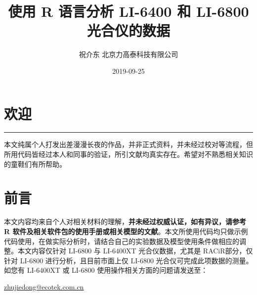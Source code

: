 \documentclass[
]{krantz}
\title{使用 R 语言分析 LI-6400 和 LI-6800 光合仪的数据}
\author{祝介东 北京力高泰科技有限公司}
\date{2019-09-25}
\begin{document}
\maketitle





\thispagestyle{empty}

\setlength{\abovedisplayskip}{-5pt}
\setlength{\abovedisplayshortskip}{-5pt}

{
\hypersetup{linkcolor=}
\setcounter{tocdepth}{2}
\tableofcontents
}
\listoftables
\listoffigures
\hypertarget{welcome}{%
\chapter*{欢迎}\label{welcome}}


\begin{center}\rule{0.5\linewidth}{\linethickness}\end{center}

本文纯属个人打发出差漫漫长夜的作品，并非正式资料，并未经过校对等流程，但所用代码皆经过本人和同事的验证，所引文献均真实存在。希望对不熟悉相关知识的童鞋们有所帮助。

\frontmatter

\hypertarget{frontmatter}{%
\chapter*{前言}\label{frontmatter}}


本文内容均来自个人对相关材料的理解，\textbf{并未经过权威认证，如有异议，请参考 R 软件及相关软件包的使用手册或相关模型的文献}。本文所使用代码均只做示例代码使用，在做实际分析时，请结合自己的实验数据及模型使用条件做相应的调整。本文内容仅针对
LI-6800 与 LI-6400XT 光合仪数据，尤其是 RACiR\texttrademark 部分，仅针对 LI-6800
进行分析，且目前市面上仅 LI-6800 光合仪可完成此项数据的测量。如您有 LI-6400XT 或 LI-6800 使用操作相关方面的问题请发送至：

\url{zhujiedong@ecotek.com.cn}
\end{document}
